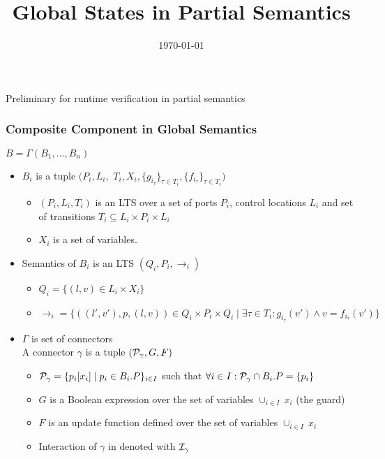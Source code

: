 \documentclass{beamer}
\title[Partial Semantics]{Global States in Partial Semantics}
\author[H.~Nazarpour]{}
\institute[Verimag]{}
\date{\today}
\begin{document}
\begin{frame}
  \titlepage

  \begin{center}
    Preliminary for runtime verification in partial semantics
  \end{center}
\end{frame}


\begin{frame}
\frametitle{Composite Component in Global Semantics}


$B=\Gamma(B_1,...,B_n)$
\begin{itemize}
\small
\item<2-> $B_i$ is a tuple $(P_i,L_i,$ $T_i,X_i,\{g_{i_\tau}\}_{\tau \in T_i}, \{f_{i_\tau}\}_{\tau \in T_i})$
\begin{itemize}
\scriptsize
\item<3-> $(P_i,L_i,T_i)$ is an LTS over a set of ports $P_i$, control locations $L_i$ and set of transitions $T_i \subseteq L_i \times P_i \times L_i$ 
\item<4-> $X_i$ is a set of variables.
\end{itemize}


\item<5-> Semantics of $B_i$ is an LTS $(Q_i,P_i,\rightarrow_i)$
\begin{itemize}
\scriptsize
\item<6-> $Q_i=\{(l,v)\in L_i\times X_i \}$
\item<7-> $\rightarrow_i= \{ ((l',v'),p,(l,v))\in Q_i\times P_i\times Q_i\mid \exists \tau\in T_i: g_{i_\tau}(v') \wedge v=f_{i_\tau}(v')\}$
\end{itemize}

\item<8-> $\Gamma$ is set of connectors\\
A connector $\gamma$ is a tuple $({\cal P}_\gamma,G,F)$
\begin{itemize}
\scriptsize
\item ${\cal P}_\gamma = \{p_i[x_i]\mid p_i\in B_i.P\}_{i \in I}$ such that $\forall i\in I: {\cal P}_\gamma \cap B_i.P = \{p_i\}$
\item $G$ is a Boolean expression over the set of variables $\cup_{i\in I}\ x_i$ (the guard)
\item $F$ is an update function defined over the set of variables $\cup_{i\in I}\ x_i$
\item Interaction of $\gamma$ in denoted with ${\cal I}_\gamma$
\end{itemize}
\end{itemize}


\end{frame}
\end{document}
